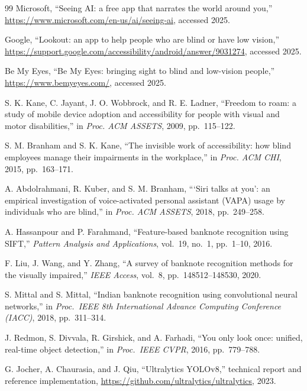 \documentclass[11pt,a4paper]{article}
\begin{document}
\begin{thebibliography}{99}
Microsoft, ``Seeing AI: a free app that narrates the world around you,''
\url{https://www.microsoft.com/en-us/ai/seeing-ai}, accessed 2025.

Google, ``Lookout: an app to help people who are blind or have low
vision,'' \url{https://support.google.com/accessibility/android/answer/9031274},
accessed 2025.

Be My Eyes, ``Be My Eyes: bringing sight to blind and low-vision
people,'' \url{https://www.bemyeyes.com/}, accessed 2025.

S. K. Kane, C. Jayant, J. O. Wobbrock, and R. E. Ladner, ``Freedom to
roam: a study of mobile device adoption and accessibility for people
with visual and motor disabilities,'' in \emph{Proc. ACM ASSETS}, 2009,
pp.\ 115--122.

S. M. Branham and S. K. Kane, ``The invisible work of accessibility:
how blind employees manage their impairments in the workplace,'' in
\emph{Proc. ACM CHI}, 2015, pp.\ 163--171.

A. Abdolrahmani, R. Kuber, and S. M. Branham, ```Siri talks at you':
an empirical investigation of voice-activated personal assistant (VAPA)
usage by individuals who are blind,'' in \emph{Proc. ACM ASSETS}, 2018,
pp.\ 249--258.

A. Hassanpour and P. Farahmand, ``Feature-based banknote recognition
using SIFT,'' \emph{Pattern Analysis and Applications}, vol.\ 19, no.\
1, pp.\ 1--10, 2016.

F. Liu, J. Wang, and Y. Zhang, ``A survey of banknote recognition
methods for the visually impaired,'' \emph{IEEE Access}, vol.\ 8, pp.\
148512--148530, 2020.

S. Mittal and S. Mittal, ``Indian banknote recognition using
convolutional neural networks,'' in \emph{Proc.\ IEEE 8th International
Advance Computing Conference (IACC)}, 2018, pp.\ 311--314.

J. Redmon, S. Divvala, R. Girshick, and A. Farhadi, ``You only look
once: unified, real-time object detection,'' in \emph{Proc.\ IEEE CVPR},
2016, pp.\ 779--788.

G. Jocher, A. Chaurasia, and J. Qiu, ``Ultralytics YOLOv8,'' technical
report and reference implementation,
\url{https://github.com/ultralytics/ultralytics}, 2023.


\end{thebibliography}
\end{document}
